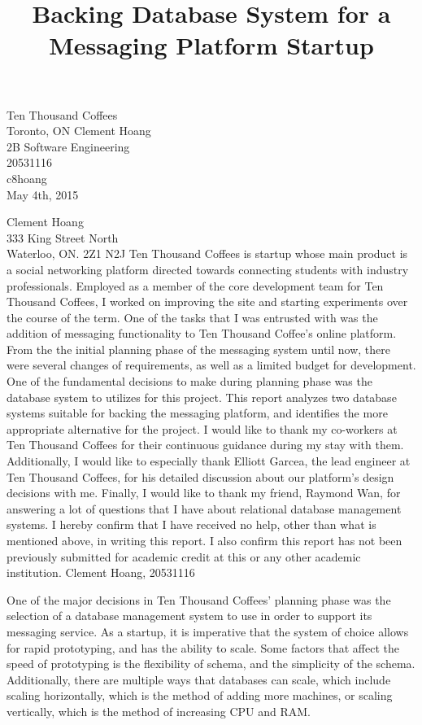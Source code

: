 \documentclass[12pt]{article}
\begin{document}
\title{Backing Database System for a Messaging Platform Startup}
{
	Ten Thousand Coffees\\
	Toronto, ON
}
{
	Clement Hoang\\
	2B Software Engineering\\
	20531116\\
	c8hoang\\
	May 4th, 2015
}


{
	\noindent
	Clement Hoang\\
	333 King Street North\\
	Waterloo, ON. 2Z1 N2J
}
{
	Ten Thousand Coffees is startup whose main product is a social networking platform directed towards connecting students with industry professionals. Employed as a member of the core development team for Ten Thousand Coffees, I worked on improving the site and starting experiments over the course of the term. One of the tasks that I was entrusted with was the addition of messaging functionality to Ten Thousand Coffee's online platform.
}
{
	From the the initial planning phase of the messaging system until now, there were several changes of requirements, as well as a limited budget for development. One of the fundamental decisions to make during planning phase was the database system to utilizes for this project. This report analyzes two database systems suitable for backing the messaging platform, and identifies the more appropriate alternative for the project.
}
{
	I would like to thank my co-workers at Ten Thousand Coffees for their continuous guidance during my stay with them. Additionally, I would like to especially thank Elliott Garcea, the lead engineer at Ten Thousand Coffees, for his detailed discussion about our platform's design decisions with me. Finally, I would like to thank my friend, Raymond Wan, for answering a lot of questions that I have about relational database management systems. I hereby confirm that I have received no help, other than what is mentioned above, in writing this report. I also confirm this report has not been previously submitted for academic credit at this or any other academic institution.
}
{
	Clement Hoang, 20531116
}


One of the major decisions in Ten Thousand Coffees' planning phase was the selection of a database management system to use in order to support its messaging service. As a startup, it is imperative that the system of choice allows for rapid prototyping, and has the ability to scale. Some factors that affect the speed of prototyping is the flexibility of schema, and the simplicity of the schema. Additionally, there are multiple ways that databases can scale, which include scaling horizontally, which is the method of adding more machines, or scaling vertically, which is the method of increasing CPU and RAM.
\end{document}
